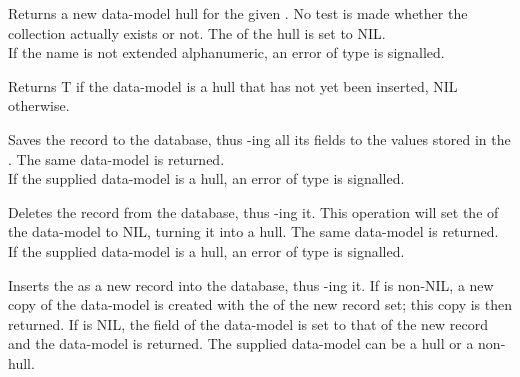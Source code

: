 Returns a new data-model hull for the given . No test is made whether the collection actually exists or not. The  of the hull is set to NIL. \\

\noindent If the  name is not extended alphanumeric, an error of type  is signalled.

Returns T if the data-model is a hull that has not yet been inserted, NIL otherwise.

Saves the record to the database, thus -ing all its fields to the values stored in the . The same data-model is returned. \\

\noindent If the supplied data-model is a hull, an error of type  is signalled.

Deletes the record from the database, thus -ing it. This operation will set the  of the data-model to NIL, turning it into a hull. The same data-model is returned.\\

\noindent If the supplied data-model is a hull, an error of type  is signalled.

Inserts the  as a new record into the database, thus -ing it. If  is non-NIL, a new copy of the data-model is created with the  of the new record set; this copy is then returned. If  is NIL, the  field of the data-model is set to that of the new record and the data-model is returned. The supplied data-model can be a hull or a non-hull.
